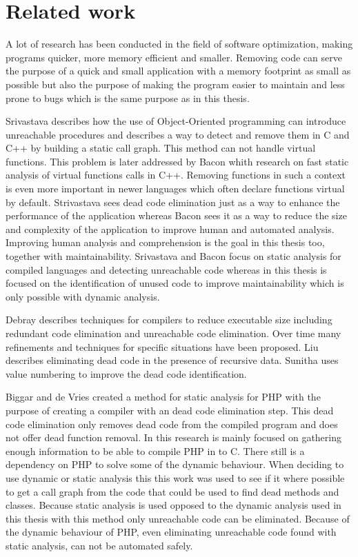 \chapter{Related work\label{ch:related}}

A lot of research has been conducted in the field of software optimization, making programs quicker, more memory efficient and smaller. Removing code can serve the purpose of a quick and small application with a memory footprint as small as possible but also the purpose of making the program easier to maintain and less prone to bugs which is the same purpose as in this thesis.

Srivastava\cite{srivastava1992} describes how the use of Object-Oriented programming can introduce unreachable procedures and describes a way to detect and remove them in C and C++ by building a static call graph. This method can not handle virtual functions. This problem is later addressed by Bacon\cite{bacon1996} whith research on fast static analysis of virtual functions calls in C++. Removing functions in such a context is even more important in newer languages which often declare functions virtual by default. Strivastava sees dead code elimination just as a way to enhance the performance of the application whereas Bacon sees it as a way to reduce the size and complexity of the application to improve human and automated analysis. Improving human analysis and comprehension is the goal in this thesis too, together with maintainability. Srivastava and Bacon focus on static analysis for compiled languages and detecting unreachable code whereas in this thesis is focused on the identification of unused code to improve maintainability which is only possible with dynamic analysis.

Debray\cite{debray2000} describes techniques for compilers to reduce executable size including redundant code elimination and unreachable code elimination.  Over time many refinements and techniques for specific situations have been proposed. Liu\cite{liu1999} describes eliminating dead code in the presence of recursive data. Sunitha\cite{sunitha2006} uses value numbering to improve the dead code identification. 

Biggar and de Vries\cite{biggar2009draft,biggar2009,biggar2010,devries2007} created a method for static analysis for PHP with the purpose of creating a compiler with an dead code elimination step. This dead code elimination only removes dead code from the compiled program and does not offer dead function removal. In this research is mainly focused on gathering enough information to be able to compile PHP in to C. There still is a dependency on PHP to solve some of the dynamic behaviour. When deciding to use dynamic or static analysis this this work was used to see if it where possible to get a call graph from the code that could be used to find dead methods and classes. Because static analysis is used opposed to the dynamic analysis used in this thesis with this method only unreachable code can be eliminated. Because of the dynamic behaviour of PHP, even eliminating unreachable code found with static analysis, can not be automated safely.

